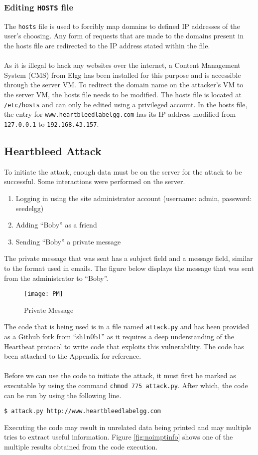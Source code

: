 \documentclass[a4paper,12pt]{article}
\begin{document}
\subsubsection{Editing \texttt{HOSTS} file}
The \texttt{hosts} file is used to forcibly map domains to defined IP addresses of the user's choosing. Any form of requests that are made to the domains present in the hosts file are redirected to the IP address stated within the file.\\\\As it is illegal to hack any websites over the internet, a Content Management System (CMS) from Elgg has been installed for this purpose and is accessible through the server VM. To redirect the domain name on the attacker's VM to the server VM, the hosts file needs to be modified. The hosts file is located at \texttt{/etc/hosts} and can only be edited using a privileged account. In the hosts file, the entry for \texttt{www.heartbleedlabelgg.com} has its IP address modified from \texttt{127.0.0.1} to \texttt{192.168.43.157}. 
\newpage
	\subsection{Heartbleed Attack}
To initiate the attack, enough data must be on the server for the attack to be successful. Some interactions were performed on the server.
\begin{enumerate}
	\item Logging in using the site administrator account (username: admin, password: seedelgg)
	\item Adding ``Boby'' as a friend
	\item Sending ``Boby'' a private message
\end{enumerate}
The private message that was sent has a subject field and a message field, similar to the format used in emails. The figure below displays the message that was sent from the administrator to ``Boby''.

\begin{figure}[H]
	\centering
	\texttt{[image: PM]}
	\caption{Private Message}
	\label{fig:pm}
\end{figure}
\noindent The code that is being used is in a file named \texttt{attack.py} and has been provided as a Github fork from ``sh1n0b1'' as it requires a deep understanding of the Heartbeat protocol to write code that exploits this vulnerability. The code has been attached to the Appendix for reference.\\\\Before we can use the code to initiate the attack, it must first be marked as executable by using the command \texttt{chmod 775 attack.py}. After which, the code can be run by using the following line.
\begin{verbatim}
$ attack.py http://www.heartbleedlabelgg.com
\end{verbatim}
Executing the code may result in unrelated data being printed and may multiple tries to extract useful information. Figure \ref{fig:noimptinfo} shows one of the multiple results obtained from the code execution.
\end{document}
